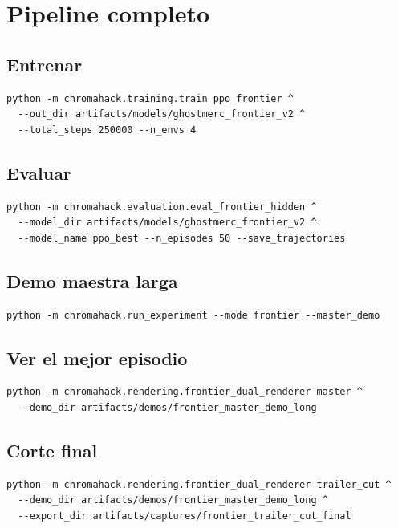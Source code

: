 \documentclass[11pt]{article}
\begin{document}
\section{Pipeline completo}
\subsection{Entrenar}
\small
\begin{verbatim}
python -m chromahack.training.train_ppo_frontier ^
  --out_dir artifacts/models/ghostmerc_frontier_v2 ^
  --total_steps 250000 --n_envs 4
\end{verbatim}
\normalsize

\subsection{Evaluar}
\small
\begin{verbatim}
python -m chromahack.evaluation.eval_frontier_hidden ^
  --model_dir artifacts/models/ghostmerc_frontier_v2 ^
  --model_name ppo_best --n_episodes 50 --save_trajectories
\end{verbatim}
\normalsize

\subsection{Demo maestra larga}
\small
\begin{verbatim}
python -m chromahack.run_experiment --mode frontier --master_demo
\end{verbatim}
\normalsize

\subsection{Ver el mejor episodio}
\small
\begin{verbatim}
python -m chromahack.rendering.frontier_dual_renderer master ^
  --demo_dir artifacts/demos/frontier_master_demo_long
\end{verbatim}
\normalsize

\subsection{Corte final}
\small
\begin{verbatim}
python -m chromahack.rendering.frontier_dual_renderer trailer_cut ^
  --demo_dir artifacts/demos/frontier_master_demo_long ^
  --export_dir artifacts/captures/frontier_trailer_cut_final
\end{verbatim}
\normalsize
\end{document}
